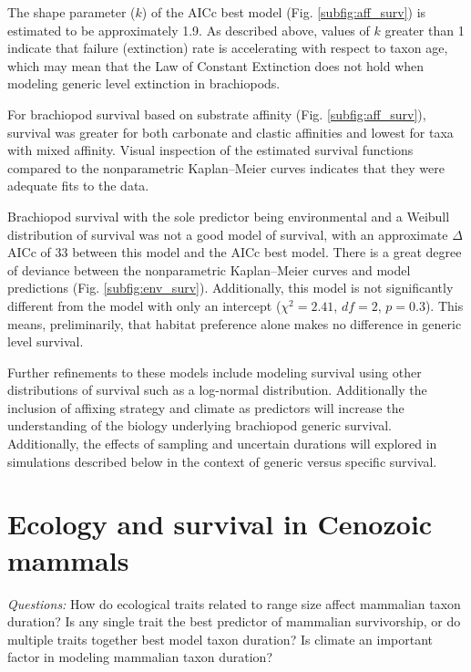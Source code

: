 \documentclass[12pt,letterpaper]{article}
\begin{document}
The shape parameter (\(k\)) of the AICc best model (Fig. \ref{subfig:aff_surv}) is estimated to be approximately 1.9. As described above, values of \(k\) greater than 1 indicate that failure (extinction) rate is accelerating with respect to taxon age, which may mean that the Law of Constant Extinction does not hold when modeling generic level extinction in brachiopods.

For brachiopod survival based on substrate affinity (Fig. \ref{subfig:aff_surv}), survival was greater for both carbonate and clastic affinities and lowest for taxa with mixed affinity. Visual inspection of the estimated survival functions compared to the nonparametric Kaplan--Meier curves indicates that they were adequate fits to the data. 

Brachiopod survival with the sole predictor being environmental and a Weibull distribution of survival was not a good model of survival, with an approximate \(\Delta\)AICc of 33 between this model and the AICc best model. There is a great degree of deviance between the nonparametric Kaplan--Meier curves and model predictions (Fig. \ref{subfig:env_surv}). Additionally, this model is not significantly different from the model with only an intercept (\(\chi^{2} = 2.41\), \(df = 2\), \(p = 0.3\)). This means, preliminarily, that habitat preference alone makes no difference in generic level survival.

Further refinements to these models include modeling survival using other distributions of survival such as a log-normal distribution. Additionally the inclusion of affixing strategy and climate as predictors will increase the understanding of the biology underlying brachiopod generic survival. Additionally, the effects of sampling and uncertain durations will explored in simulations described below in the context of generic versus specific survival.


\section{Ecology and survival in Cenozoic mammals}

\textit{Questions:} 
How do ecological traits related to range size affect mammalian taxon duration? Is any single trait the best predictor of mammalian survivorship, or do multiple traits together best model taxon duration? Is climate an important factor in modeling mammalian taxon duration?
\end{document}
